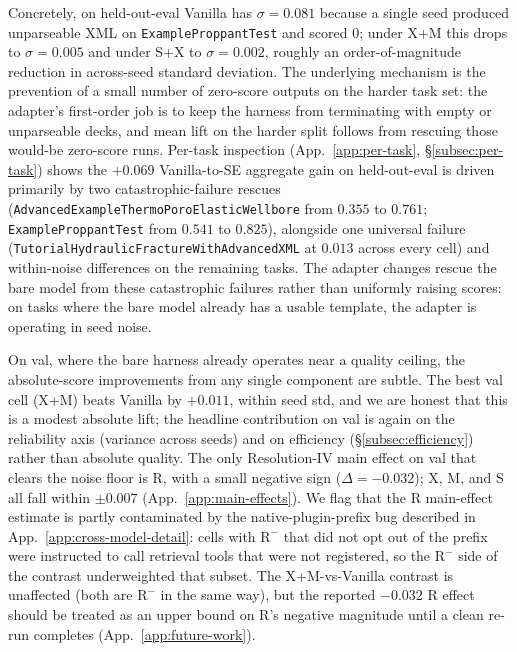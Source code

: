 \documentclass{article}
\begin{document}
Concretely, on held-out-eval Vanilla has $\sigma = 0.081$ because a single seed produced unparseable XML on \texttt{ExampleProppantTest} and scored 0; under X+M this drops to $\sigma = 0.005$ and under S+X to $\sigma = 0.002$, roughly an order-of-magnitude reduction in across-seed standard deviation. The underlying mechanism is the prevention of a small number of zero-score outputs on the harder task set: the adapter's first-order job is to keep the harness from terminating with empty or unparseable decks, and mean lift on the harder split follows from rescuing those would-be zero-score runs. Per-task inspection (App.~\ref{app:per-task}, \S\ref{subsec:per-task}) shows the $+0.069$ Vanilla-to-SE aggregate gain on held-out-eval is driven primarily by two catastrophic-failure rescues (\texttt{AdvancedExampleThermoPoroElasticWellbore} from $0.355$ to $0.761$; \texttt{ExampleProppantTest} from $0.541$ to $0.825$), alongside one universal failure (\texttt{TutorialHydraulicFractureWithAdvancedXML} at $0.013$ across every cell) and within-noise differences on the remaining tasks. The adapter changes rescue the bare model from these catastrophic failures rather than uniformly raising scores: on tasks where the bare model already has a usable template, the adapter is operating in seed noise.

\label{subsec:per-task}On val, where the bare harness already operates near a quality ceiling, the absolute-score improvements from any single component are subtle. The best val cell (X+M) beats Vanilla by $+0.011$, within seed std, and we are honest that this is a modest absolute lift; the headline contribution on val is again on the reliability axis (variance across seeds) and on efficiency (\S\ref{subsec:efficiency}) rather than absolute quality. The only Resolution-IV main effect on val that clears the noise floor is R, with a small negative sign ($\Delta = -0.032$); X, M, and S all fall within $\pm 0.007$ (App.~\ref{app:main-effects}). We flag that the R main-effect estimate is partly contaminated by the native-plugin-prefix bug described in App.~\ref{app:cross-model-detail}: cells with $\mathrm{R^-}$ that did not opt out of the prefix were instructed to call retrieval tools that were not registered, so the $\mathrm{R^-}$ side of the contrast underweighted that subset. The X+M-vs-Vanilla contrast is unaffected (both are $\mathrm{R^-}$ in the same way), but the reported $-0.032$ R effect should be treated as an upper bound on R's negative magnitude until a clean re-run completes (App.~\ref{app:future-work}).
\end{document}
